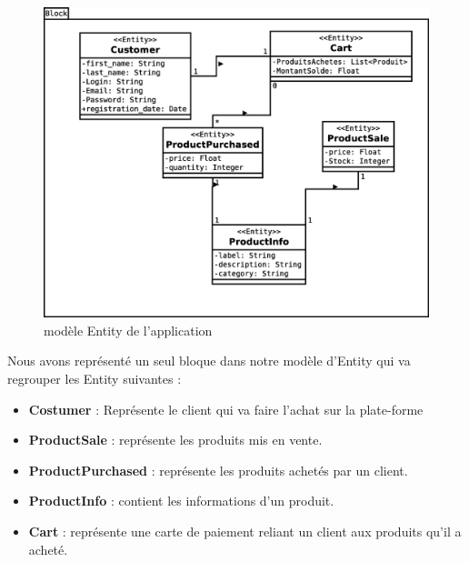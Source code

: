 \begin{figure}[H]
  \centering
  \includegraphics[scale=.4]{img/Entitymodel.eps}
  \caption{modèle Entity de l'application}
  \label{fig:entMod}
\end{figure}

Nous avons représenté un seul bloque dans notre modèle d'Entity qui va regrouper les Entity suivantes :  

\begin{itemize}
  \item[\textbullet] \textbf{Costumer} : Représente le client qui va faire l'achat sur la plate-forme
  \item[\textbullet] \textbf{ProductSale} : représente les produits mis en vente.
  \item[\textbullet]	\textbf{ProductPurchased} : représente les produits achetés par un client.
  \item[\textbullet] \textbf{ProductInfo} : contient les informations d'un produit.
  \item[\textbullet] \textbf{Cart} : représente une carte de paiement reliant un client aux produits qu'il a acheté.
   
\end{itemize}

